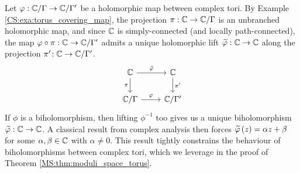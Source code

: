 \documentclass[../Moduli_Spaces_of_Riemann_Surfaces.tex]{subfiles}
\begin{document}
    \begin{example}\label{CS:exa:lift_torus}
        Let $\varphi:\mathbb{C}/\Gamma\to\mathbb{C}/\Gamma'$ be a holomorphic map between complex tori. By Example \ref{CS:exa:torus_covering_map}, the projection $\pi:\mathbb{C}\to\mathbb{C}/\Gamma$ is an unbranched holomorphic map, and since $\mathbb{C}$ is simply-connected (and locally path-connected), the map $\varphi\circ\pi:\mathbb{C}\to\mathbb{C}/\Gamma'$ admits a unique holomorphic lift $\widetilde{\varphi}:\mathbb{C}\to\mathbb{C}$ along the projection $\pi'\!:\mathbb{C}\to\mathbb{C}/\Gamma'$.
        \begin{equation*}
            \begin{tikzcd}
                \C \ar[r, "\tilde{\phi}"] \ar[d, "\pi"'] & \C \ar[d, "\pi'"] \\
                \C/\Gamma \ar[r, "\phi"] & \C/\Gamma'
            \end{tikzcd}
        \end{equation*}
        If $\phi$ is a biholomorphism, then lifting $\phi^{-1}$ too gives us a unique biholomorphism $\widetilde{\varphi}:\mathbb{C}\to\mathbb{C}$. A classical result from complex analysis then forces $\widetilde{\varphi}\left(z\right)=\alpha z+\beta$ for some $\alpha,\beta\in\mathbb{C}$ with $\alpha\neq0$. This result tightly constrains the behaviour of biholomorphisms between complex tori, which we leverage in the proof of Theorem \ref{MS:thm:moduli_space_torus}.\exqed
    \end{example}
\end{document}
